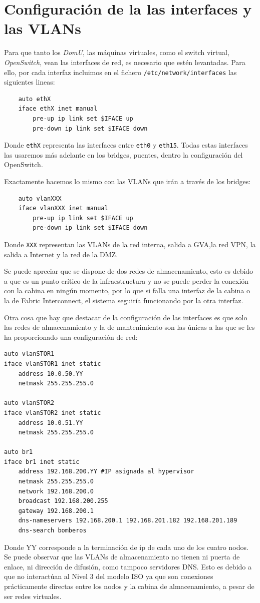 \documentclass[12pt,a4paper,titlepage,twoside]{report}
\begin{document}
\section{Configuración de la las interfaces y las VLANs}
Para que tanto los \textit{DomU}, las máquinas virtuales, como el switch virtual, \textit{OpenSwitch}, vean las interfaces de red, es necesario que estén levantadas. Para ello, por cada interfaz incluimos en el fichero \verb|/etc/network/interfaces| las siguientes lineas:
\begin{verbatim}
    auto ethX
    iface ethX inet manual
        pre-up ip link set $IFACE up
        pre-down ip link set $IFACE down
\end{verbatim}
Donde \verb|ethX| representa las interfaces entre \verb|eth0| y \verb|eth15|. Todas estas interfaces las usaremos más adelante en los bridges, puentes, dentro la configuración del OpenSwitch.
\par Exactamente hacemos lo mismo con las VLANs que irán a través de los bridges:
\begin{verbatim}
    auto vlanXXX
    iface vlanXXX inet manual
        pre-up ip link set $IFACE up
        pre-down ip link set $IFACE down
\end{verbatim}
Donde \verb|XXX| representan las VLANs de la red interna, salida a GVA,la red VPN, la salida a Internet y la red de la DMZ.
\par
Se puede apreciar que se dispone de dos redes de almacenamiento, esto es debido a que es un punto crítico de la infraestructura y no se puede perder la conexión con la cabina en ningún momento, por lo que si falla una interfaz de la cabina o la de Fabric Interconnect, el sistema seguiría funcionando por la otra interfaz.
\par Otra cosa que hay que destacar de la configuración de las interfaces es que solo las redes de almacenamiento y la de mantenimiento son las únicas a las que se les ha proporcionado una configuración de red:
\begin{verbatim}
auto vlanSTOR1 
iface vlanSTOR1 inet static 
    address 10.0.50.YY 
    netmask 255.255.255.0 

auto vlanSTOR2 
iface vlanSTOR2 inet static 
    address 10.0.51.YY 
    netmask 255.255.255.0 

auto br1 
iface br1 inet static 
    address 192.168.200.YY #IP asignada al hypervisor
    netmask 255.255.255.0 
    network 192.168.200.0 
    broadcast 192.168.200.255 
    gateway 192.168.200.1 
    dns-nameservers 192.168.200.1 192.168.201.182 192.168.201.189 
    dns-search bomberos 
\end{verbatim}
Donde YY corresponde a la terminación de ip de cada uno de los cuatro nodos. Se puede observar que las VLANs de almacenamiento no tienen ni puerta de enlace, ni dirección de difusión, como tampoco servidores DNS. Esto es debido a que no interactúan al Nivel 3 del modelo ISO ya que son conexiones prácticamente directas entre los nodos y la cabina de almacenamiento, a pesar de ser redes virtuales.
\end{document}
